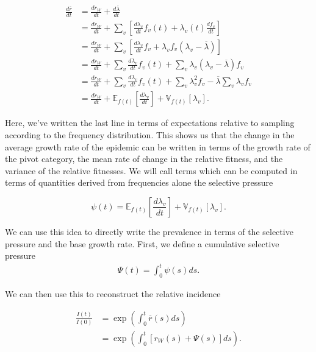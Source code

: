 \documentclass[11pt,oneside,letterpaper]{article}
\newcommand{\Expect}{\mathbb{E}}
\newcommand{\Var}{\mathbb{V}}
\newcommand{\wt}{W}
\begin{document}
\begin{align}
    \frac{d \overline{r}}{d t} &= \frac{d r_{\wt}}{d t} + \frac{d \overline{\lambda}}{d t} \\
                               &= \frac{d r_{\wt}}{d t} + \sum_{v} \left[\frac{d \lambda_v}{d t} f_{v}(t) + \lambda_{v}(t) \frac{d f_{v}}{d t} \right]\\
                               &= \frac{d r_{\wt}}{d t} + \sum_{v} \left[\frac{d \lambda_v}{d t} f_{v} + \lambda_{v} f_{v} (\lambda_{v} - \overline{\lambda})  \right]\\
                               &= \frac{d r_{\wt}}{dt} + \sum_{v} \frac{d \lambda_v}{d t} f_{v}(t) + \sum_{v} \lambda_{v} (\lambda_{v} - \overline{\lambda}) f_{v}\\
                               &= \frac{d r_{\wt}}{dt} + \sum_{v} \frac{d \lambda_v}{d t} f_{v}(t) + \sum_{v} \lambda_{v}^{2} f_{v} - \overline{\lambda}\sum_{v} \lambda_{v} f_{v}\\
                               &= \frac{d r_{\wt}}{d t} + \Expect_{f(t)}\left[ \frac{d \lambda_v}{d t}\right] +  \Var_{f(t)}[\lambda_{v}].
\end{align}

Here, we've written the last line in terms of expectations relative to sampling according to the frequency distribution.
This shows us that the change in the average growth rate of the epidemic can be written in terms of the growth rate of the pivot category, the mean rate of change in the relative fitness, and the variance of the relative fitnesses.
We will call terms which can be computed in terms of quantities derived from frequencies alone the selective pressure

\begin{equation}
\psi(t) =  \Expect_{f(t)}\left[ \frac{d \lambda_v}{d t}\right] +  \Var_{f(t)}[\lambda_{v}].
\end{equation}

We can use this idea to directly write the prevalence in terms of the selective pressure and the base growth rate.
First, we define a cumulative selective pressure
\begin{align}
\Psi(t) = \int_{0}^{t} \psi(s) ds.
\end{align}

We can then use this to reconstruct the relative incidence

\begin{align}
    \frac{I(t)}{I(0)} &= \exp\left(\int_{0}^{t} \overline{r}(s) ds\right)\\
         &= \exp \left(\int_{0}^{t} [r_{\wt}(s) + \Psi(s)]ds \right).
\end{align}
\end{document}

